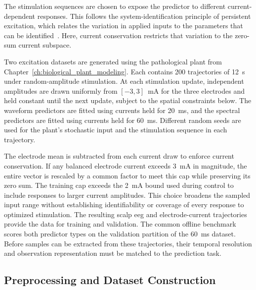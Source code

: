 The stimulation sequences are chosen to expose the predictor to different current-dependent responses.
This follows the system-identification principle of persistent excitation, which relates the variation in applied inputs to the parameters that can be identified~\cite{Ljung1999}.
Here, current conservation restricts that variation to the zero-sum current subspace.

Two excitation datasets are generated using the pathological plant from Chapter~\ref{ch:biological_plant_modeling}.
Each contains 200 trajectories of \SI{12}{\second} under random-amplitude stimulation.
At each stimulation update, independent amplitudes are drawn uniformly from $[-3, 3]$~\si{\milli\ampere} for the three electrodes and held constant until the next update, subject to the spatial constraints below.
The waveform predictors are fitted using currents held for \SI{20}{\milli\second}, and the spectral predictors are fitted using currents held for \SI{60}{\milli\second}.
Different random seeds are used for the plant's stochastic input and the stimulation sequence in each trajectory.

The electrode mean is subtracted from each current draw to enforce current conservation.
If any balanced electrode current exceeds \SI{3}{\milli\ampere} in magnitude, the entire vector is rescaled by a common factor to meet this cap while preserving its zero sum.
The training cap exceeds the \SI{2}{\milli\ampere} bound used during control to include responses to larger current amplitudes.
This choice broadens the sampled input range without establishing identifiability or coverage of every response to optimized stimulation.
The resulting scalp \ac{eeg} and electrode-current trajectories provide the data for training and validation.
The common offline benchmark scores both predictor types on the validation partition of the \SI{60}{\milli\second} dataset.
Before samples can be extracted from these trajectories, their temporal resolution and observation representation must be matched to the prediction task.

\subsection{Preprocessing and Dataset Construction}

